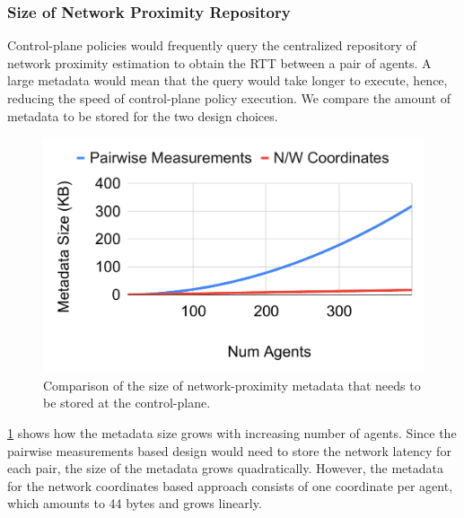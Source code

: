 \subsubsection{Size of Network Proximity Repository}
Control-plane policies would frequently query the centralized repository of network proximity estimation to obtain the RTT between a pair of agents. A large metadata would mean that the query would take longer to execute, hence, reducing the speed of control-plane policy execution. We compare the amount of metadata to be stored for the two design choices. 

\begin{figure}
\centering
\includegraphics[width=0.75\linewidth]{figures/design_space/nw_prox/metadata_size.pdf}
\caption{Comparison of the size of network-proximity metadata that needs to be stored at the control-plane.}
\label{fig:metadata_size}
\end{figure}

\par \cref{fig:metadata_size} shows how the metadata size grows with increasing number of agents. Since the pairwise measurements based design would need to store the network latency for each pair, the size of the metadata grows quadratically. However, the metadata for the network coordinates based approach consists of one coordinate per agent, which amounts to 44 bytes and grows linearly.


